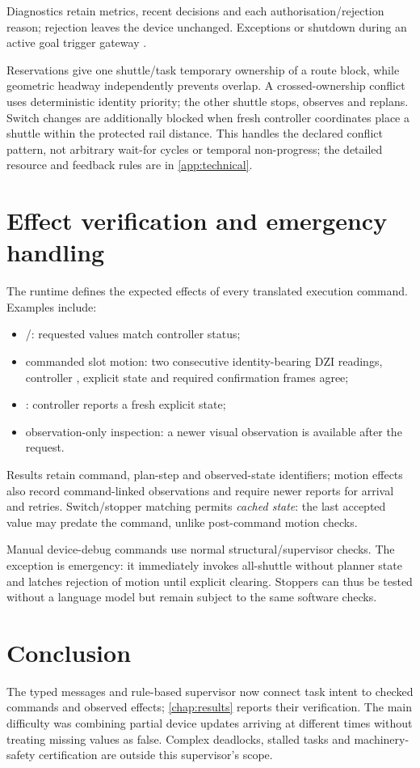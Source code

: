Diagnostics retain metrics, recent decisions and each authorisation/rejection
reason; rejection leaves the device unchanged. Exceptions or shutdown during
an active goal trigger gateway .

Reservations give one shuttle/task temporary ownership of a route block, while
geometric headway independently prevents overlap. A crossed-ownership conflict
uses deterministic identity priority; the other shuttle stops, observes and
replans. Switch changes are additionally blocked when fresh controller
coordinates place a shuttle within the protected rail distance. This handles
the declared conflict pattern, not arbitrary wait-for cycles or temporal
non-progress; the detailed resource and feedback rules are in
\cref{app:technical}.

\section{Effect verification and emergency handling}

The runtime defines the expected effects of every translated execution
command. Examples include:

\begin{itemize}
  \item {}/: requested values match
  controller status;
  \item commanded slot motion: two consecutive identity-bearing DZI readings,
  controller
  , explicit  state and required
  confirmation frames agree;
  \item {}: controller reports a fresh explicit
   state;
  \item observation-only inspection: a newer visual observation is
  available after the request.
\end{itemize}

Results retain command, plan-step and observed-state identifiers; motion effects
also record command-linked observations and require newer reports for arrival
and retries. Switch/stopper matching permits \emph{cached state}: the last
accepted value may predate the command, unlike post-command motion checks.

Manual device-debug commands use normal structural/supervisor checks. The
exception is emergency: it immediately invokes all-shuttle 
without planner state and latches rejection of motion until explicit clearing.
Stoppers can thus be tested without a language model but remain subject to the
same software checks.

\section{Conclusion}

The typed messages and rule-based supervisor now connect task intent to checked
commands and observed effects; \cref{chap:results} reports their verification.
The main difficulty was combining partial device updates arriving at different
times without treating missing values as false. Complex deadlocks, stalled tasks
and machinery-safety certification are outside this supervisor's scope.
